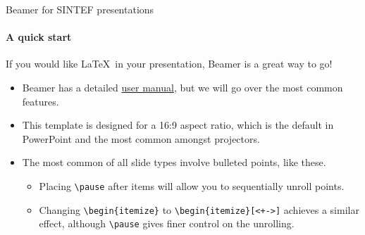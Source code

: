 \documentclass{beamer}
\newcommand{\hrefcol}[2]{\textcolor{uihteal}{\href{#1}{#2}}}
\begin{document}
\begin{frame}[fragile]{Beamer for SINTEF presentations}
	\framesubtitle{A quick start}
	If you would like \LaTeX\ in your presentation, Beamer is a great way to go!
	\begin{itemize}
		\item Beamer has a detailed
		      \hrefcol{https://www.ctan.org/tex-archive/macros/latex/contrib/beamer/doc/beameruserguide.pdf}{user
			      manual}, but we will go over the most common features.
		\item This template is designed for a 16:9 aspect ratio, which is the default in PowerPoint and the most common amongst projectors.
		\item The most common of all slide types involve bulleted points, like these. \pause
		      \begin{itemize}
			      \item Placing \verb|\pause| after items will allow you to sequentially unroll points.
			      \item Changing \verb|\begin{itemize}| to \verb|\begin{itemize}[<+->]| achieves a similar effect, although \verb|\pause| gives finer control on the unrolling.
		      \end{itemize}
	\end{itemize}
\end{frame}
\end{document}
